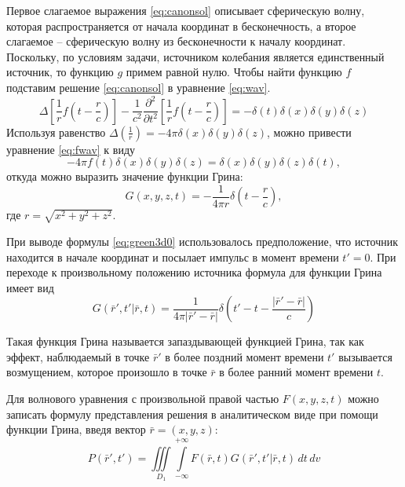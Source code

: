 \documentclass[a4paper, fontsize=14pt]{article}
\begin{document}
Первое слагаемое выражения \ref{eq:canonsol} описывает сферическую волну, которая распространяется от начала координат в бесконечность, а второе слагаемое -- сферическую волну из бесконечности к началу координат. Поскольку, по условиям задачи, источником колебания является единственный источник, то функцию $g$ примем равной нулю.  Чтобы найти функцию  $f$  подставим решение \ref{eq:canonsol} в уравнение \ref{eq:wav}. 
\begin{equation}
	\Delta \left[ \frac{1}{r}f\left(t-\frac{r}{c}\right) \right] - \frac{1}{c^2} \frac{\partial^2 }{\partial
		t^2}\left[ \frac{1}{r}f\left(t-\frac{r}{c}\right) \right]  = - \delta(t)\delta(x)\delta(y)\delta(z)
		\label{eq:fwav}
\end{equation}
Используя равенство $\Delta\left(\frac{1}{r}\right) = -4\pi \delta(x)\delta(y)\delta(z)$, можно привести уравнение \ref{eq:fwav}
к виду 
\begin{equation}
	-4\pi f(t) \delta(x) \delta(y) \delta(z)  = \delta(x) \delta(y) \delta(z) \delta(t),
\label{eq:fdel}	
\end{equation}
откуда можно выразить значение функции Грина:
\begin{equation}
	G(x,y,z,t) = -\frac{1}{4\pi r} \delta \left(t - \frac{r}{c}\right),
\label{eq:green3d0}	
\end{equation}  
где $r = \sqrt{x^2+y^2+z^2}$.

При выводе формулы \ref{eq:green3d0} использовалось предположение,  что источник находится в начале координат  и посылает импульс в момент времени $t' = 0$. При переходе к произвольному положению источника 
формула для функции Грина имеет вид
\begin{equation}
	G(\bar{r}',t'|\bar{r},t)= \frac{1}{4\pi|\bar{r}'-\bar{r}|}
	\delta\left(t'-t-\frac{|\bar{r}'-\bar{r}|}{c}\right)
\label{eq:green3d}
\end{equation}

	Такая функция Грина называется запаздывающей функцией Грина, так как эффект,
	наблюдаемый в точке $\bar{r}'$ в более поздний момент времени $t'$ вызывается
	возмущением,
	которое произошло в точке $\bar{r}$ в более ранний момент времени $t$.

	
	Для волнового уравнения с произвольной правой частью $F(x,y,z,t)$ можно
	записать формулу представления решения 
	в аналитическом виде при помощи функции Грина, введя вектор $\bar{r} = (x,y,z)$: \cite{zhdanov2007}
	\begin{equation}
		P(\bar{r}',t')=\iiint\limits_{D_1} \int\limits_{-\infty}^{+\infty}
		F(\bar{r},t) G(\bar{r}',t'|\bar{r},t)\,dt\,dv
	\end{equation}
	
\end{document}
